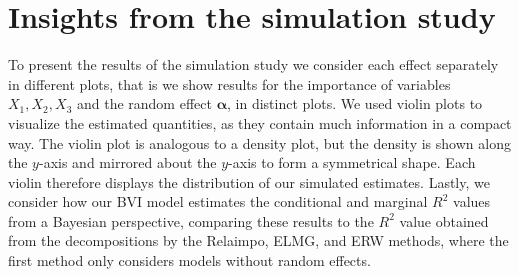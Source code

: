 \section{Insights from the simulation study}
To present the results of the simulation study we consider each effect separately in different plots, that is we show results for the importance of variables $X_1, X_2, X_3$ and the random effect $\boldsymbol{\alpha}$, in distinct plots. 
We used violin plots to visualize the estimated quantities, as they contain much information in a compact way. The violin plot is analogous to a density plot, but the density is shown along the $y$-axis and mirrored about the $y$-axis to form a symmetrical shape. Each violin therefore displays the distribution of our simulated estimates.
Lastly, we consider how our BVI model estimates the conditional and marginal $R^2$ values from a Bayesian perspective, comparing these results to the $R^2$ value obtained from the decompositions by the Relaimpo, ELMG, and ERW methods, where the first method only considers models without random effects. 
